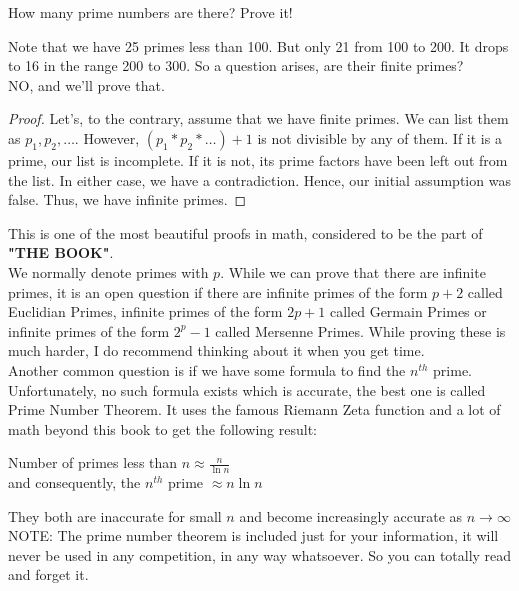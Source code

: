 \begin{example}
    How many prime numbers are there? Prove it!
\end{example}
Note that we have 25 primes less than 100. But only 21 from 100 to 200. It drops to 16 in the range 200 to 300. So a question arises, are their finite primes?\\
NO, and we'll prove that.
\begin{proof}
    Let's, to the contrary, assume that we have finite primes. We can list them as $p_1, p_2, \dots$. However, $(p_1*p_2*\dots)+1$ is not divisible by any of them. If it is a prime, our list is incomplete. If it is not, its prime factors have been left out from the list. In either case, we have a contradiction. Hence, our initial assumption was false. Thus, we have infinite primes.
\end{proof}
This is one of the most beautiful proofs in math, considered to be the part of \textbf{"THE BOOK"}.\\
We normally denote primes with $p$. While we can prove that there are infinite primes, it is an open question if there are infinite primes of the form $p+2$ called Euclidian Primes, infinite primes of the form $2p+1$ called Germain Primes or infinite primes of the form $2^p-1$  called Mersenne Primes. While proving these is much harder, I do recommend thinking about it when you get time.\\
Another common question is if we have some formula to find the $n^{th}$ prime. Unfortunately, no such formula exists which is accurate, the best one is called Prime Number Theorem. It uses the famous Riemann Zeta function and a lot of math beyond this book to get the following result:
\begin{theorem}
    Number of primes less than $n \approx \frac{n}{\ln{n}}$\\
    and consequently, the $n^{th}$ prime $ \approx n \ln{n}$
\end{theorem}
They both are inaccurate for small $n$ and become increasingly accurate as $n \to \infty$\\
NOTE: The prime number theorem is included just for your information, it will never be used in any competition, in any way whatsoever. So you can totally read and forget it.\\
